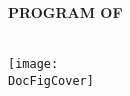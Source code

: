 \documentclass[12pt,twoside,a4paper]{book}
\begin{document}



 \thispagestyle{empty}
{\center
{\LARGE \bf PROGRAM OF } \\[6mm]
{\LARGE \bf \DocConferenceTitleB} {\LARGE \bf \DocYear}  \\ [24mm]


\begin{center} \setlength{\unitlength}{1cm}
  \texttt{[image: \\DocFigCover]}
\end{center}
\DocDate \\ %
\DocPlace \\[3mm]%
\DocURL \\
}

\newpage






%


\normalsize

\newpage
%

~
\thispagestyle{empty}
\end{document}

